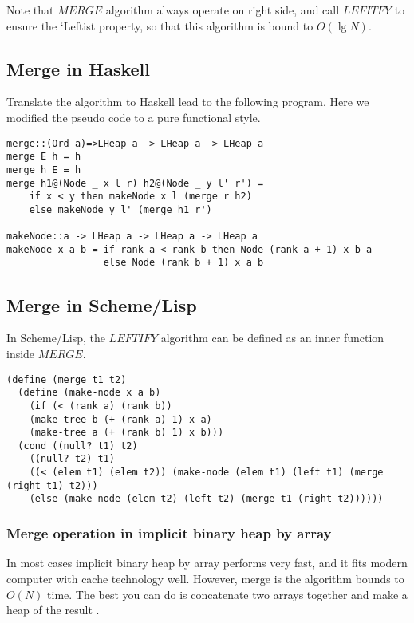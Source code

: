\documentclass{article}
\begin{document}
Note that $MERGE$ algorithm always operate on right side, and call
$LEFITFY$ to ensure the `Leftist property, so that this algorithm
is bound to $O(\lg N)$.

\subsection*{Merge in Haskell}

Translate the algorithm to Haskell lead to the following program.
Here we modified the pseudo code to a pure functional style.

\lstset{language=Haskell}
\begin{lstlisting}
merge::(Ord a)=>LHeap a -> LHeap a -> LHeap a
merge E h = h
merge h E = h
merge h1@(Node _ x l r) h2@(Node _ y l' r') =
    if x < y then makeNode x l (merge r h2)
    else makeNode y l' (merge h1 r')

makeNode::a -> LHeap a -> LHeap a -> LHeap a
makeNode x a b = if rank a < rank b then Node (rank a + 1) x b a
                 else Node (rank b + 1) x a b
\end{lstlisting}

\subsection*{Merge in Scheme/Lisp}

In Scheme/Lisp, the $LEFTIFY$ algorithm can be defined as an
inner function inside $MERGE$.

\lstset{language=lisp}
\begin{lstlisting}
(define (merge t1 t2)
  (define (make-node x a b)
    (if (< (rank a) (rank b))
	(make-tree b (+ (rank a) 1) x a)
	(make-tree a (+ (rank b) 1) x b)))
  (cond ((null? t1) t2)
	((null? t2) t1)
	((< (elem t1) (elem t2)) (make-node (elem t1) (left t1) (merge (right t1) t2)))
	(else (make-node (elem t2) (left t2) (merge t1 (right t2))))))
\end{lstlisting}

\subsubsection{Merge operation in implicit binary heap by array}

In most cases implicit binary heap by array performs very fast, and
it fits modern computer with cache technology well. However, merge
is the algorithm bounds to $O(N)$ time. The best you can do is
concatenate two arrays together and make a heap of the result \cite{NIST}.
\end{document}
